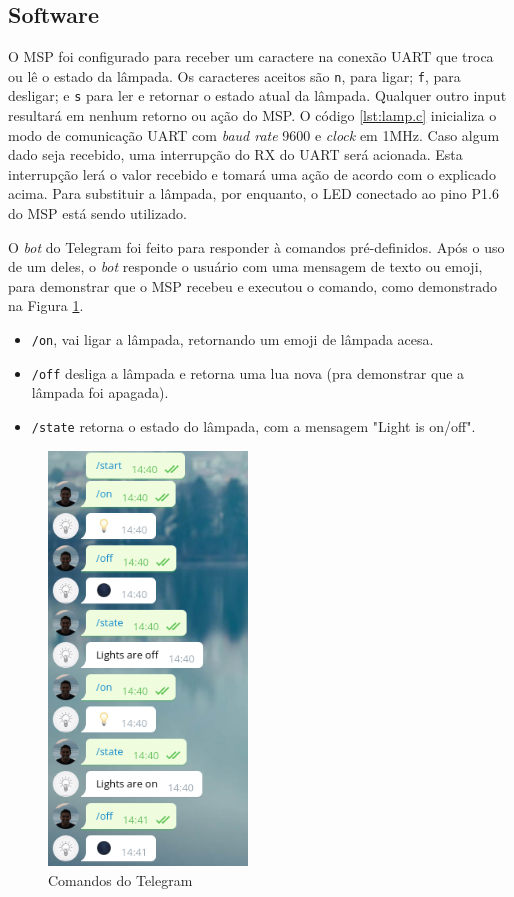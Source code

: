 \documentclass[12pt,journal,compsoc]{IEEEtran}
\begin{document}
\subsection{Software}

O MSP foi configurado para receber um caractere na conexão UART que troca ou lê o estado da lâmpada. Os caracteres aceitos são \texttt{n}, para ligar; \texttt{f}, para desligar; e \texttt{s} para ler e retornar o estado atual da lâmpada. Qualquer outro input resultará em nenhum retorno ou ação do MSP. O código \ref{lst:lamp.c} inicializa o modo de comunicação UART com \textit{baud rate} 9600 e \textit{clock} em 1MHz. Caso algum dado seja recebido, uma interrupção do RX do UART será acionada. Esta interrupção lerá o valor recebido e tomará uma ação de acordo com o explicado acima. Para substituir a lâmpada, por enquanto, o LED conectado ao pino P1.6 do MSP está sendo utilizado.



O \textit{bot} do Telegram foi feito para responder à comandos pré-definidos. Após o uso de um deles, o \textit{bot} responde o usuário com uma mensagem de texto ou emoji, para demonstrar que o MSP recebeu e executou o comando, como demonstrado na Figura \ref{fig:telegram}.

\begin{itemize}
\item \texttt{/on}, vai ligar a lâmpada, retornando um emoji de lâmpada acesa.
\item \texttt{/off} desliga a lâmpada e retorna uma lua nova (pra demonstrar que a lâmpada foi apagada).
\item \texttt{/state} retorna o estado do lâmpada, com a mensagem "Light is {on/off}".
\end{itemize}

\begin{figure}[h!]
\centering
\includegraphics[width=200px,height=\textheight,keepaspectratio]{telegram_commands}
\caption{Comandos do Telegram}
\label{fig:telegram}
\end{figure}
\end{document}
